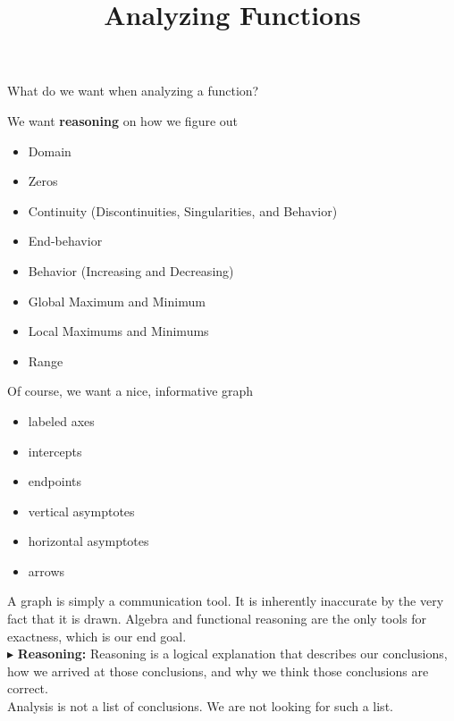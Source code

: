 \documentclass{ximera}
\title{Analyzing Functions}
\begin{document}
\begin{abstract}
%
\end{abstract}
\maketitle






What do we want when analyzing a function?


We want \textbf{\textcolor{red!80!black}{reasoning}} on how we figure out

\begin{itemize}
\item Domain
\item Zeros 
\item Continuity (Discontinuities, Singularities, and Behavior)
\item End-behavior
\item Behavior (Increasing and Decreasing)
\item Global Maximum and Minimum
\item Local Maximums and Minimums
\item Range
\end{itemize}



Of course, we want a nice, informative graph
\begin{itemize}
	\item labeled axes
	\item intercepts
	\item endpoints
	\item vertical asymptotes
	\item horizontal asymptotes
	\item arrows
\end{itemize}


A graph is simply a communication tool.  It is inherently inaccurate by the very fact that it is drawn.  Algebra and functional reasoning are the only tools for exactness, which is our end goal. \\



$\blacktriangleright$ \textbf{\textcolor{red!70!black}{Reasoning:}} Reasoning is a logical explanation that describes our conclusions, how we arrived at those conclusions, and why we think those conclusions are correct. \\

Analysis is not a list of conclusions. We are not looking for such a list. \\
\end{document}
